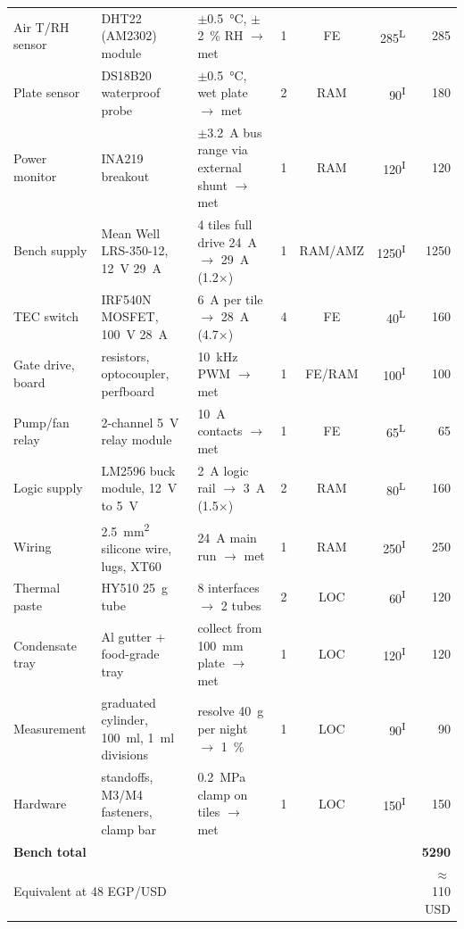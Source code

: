 \documentclass[11pt,a4paper]{article}
\newcommand{\liveflag}{\textsuperscript{L}}
\newcommand{\indflag}{\textsuperscript{I}}
\begin{document}
\begin{footnotesize}
\begin{longtable}{@{}p{2.5cm}p{4.1cm}p{3.1cm}ccrr@{}}
Air T/RH sensor & DHT22 (AM2302) module \cite{dht22ds} &
  $\pm$\SI{0.5}{\celsius}, $\pm$\SI{2}{\percent} RH $\to$ met &
  1 & FE & 285\liveflag & 285\\
Plate sensor & DS18B20 waterproof probe \cite{ds18b20ds} &
  $\pm$\SI{0.5}{\celsius}, wet plate $\to$ met &
  2 & RAM & 90\indflag & 180\\
Power monitor & INA219 breakout \cite{ina219ds} &
  $\pm$\SI{3.2}{\ampere} bus range via external shunt $\to$ met &
  1 & RAM & 120\indflag & 120\\
Bench supply & Mean Well LRS-350-12, \SI{12}{\volt} \SI{29}{\ampere}
  \cite{meanwell2023lrs} &
  4 tiles full drive \SI{24}{\ampere} $\to$ \SI{29}{\ampere} (1.2$\times$) &
  1 & RAM/AMZ & 1250\indflag & 1250\\
TEC switch & IRF540N MOSFET, \SI{100}{\volt} \SI{28}{\ampere}
  \cite{irf540ds} &
  \SI{6}{\ampere} per tile $\to$ \SI{28}{\ampere} (4.7$\times$) &
  4 & FE & 40\liveflag & 160\\
Gate drive, board & resistors, optocoupler, perfboard &
  \SI{10}{\kilo\hertz} PWM $\to$ met &
  1 & FE/RAM & 100\indflag & 100\\
Pump/fan relay & 2-channel \SI{5}{\volt} relay module &
  \SI{10}{\ampere} contacts $\to$ met &
  1 & FE & 65\liveflag & 65\\
Logic supply & LM2596 buck module, \SI{12}{\volt} to \SI{5}{\volt} &
  \SI{2}{\ampere} logic rail $\to$ \SI{3}{\ampere} (1.5$\times$) &
  2 & RAM & 80\liveflag & 160\\
Wiring & \SI{2.5}{\milli\metre\squared} silicone wire, lugs, XT60 &
  \SI{24}{\ampere} main run $\to$ met &
  1 & RAM & 250\indflag & 250\\
Thermal paste & HY510 \SI{25}{\gram} tube &
  8 interfaces $\to$ 2 tubes &
  2 & LOC & 60\indflag & 120\\
Condensate tray & Al gutter + food-grade tray &
  collect from \SI{100}{\milli\metre} plate $\to$ met &
  1 & LOC & 120\indflag & 120\\
Measurement & graduated cylinder, \SI{100}{\milli\litre},
  \SI{1}{\milli\litre} divisions &
  resolve \SI{40}{\gram} per night $\to$ \SI{1}{\percent} &
  1 & LOC & 90\indflag & 90\\
Hardware & standoffs, M3/M4 fasteners, clamp bar &
  \SI{0.2}{\mega\pascal} clamp on tiles $\to$ met &
  1 & LOC & 150\indflag & 150\\
\midrule
\multicolumn{6}{l}{\textbf{Bench total}} & \textbf{\num{5290}}\\
\multicolumn{6}{l}{Equivalent at \num{48} EGP/USD} & $\approx$ 110 USD\\
\end{longtable}
\end{footnotesize}
\end{document}
